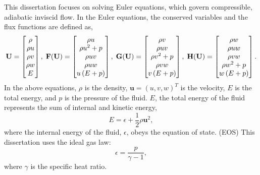 This dissertation focuses on solving Euler equations, which govern
compressible, adiabatic inviscid flow.
In the Euler equations, the conserved variables and the flux functions are defined as,
\begin{equation}\label{eq:euler-3d}
    \mathbf{U} = \begin{bmatrix}
        \rho \\
        \rho u \\
        \rho v \\
        \rho w \\
        E
    \end{bmatrix},\;
    \mathbf{F} (\mathbf{U}) = \begin{bmatrix}
        \rho u \\
        \rho u^{2} + p \\
        \rho u v \\
        \rho u w \\
        u \left( E + p \right)
    \end{bmatrix},\;
    \mathbf{G} (\mathbf{U}) = \begin{bmatrix}
        \rho v \\
        \rho u v \\
        \rho v^{2} + p \\
        \rho v w \\
        v \left( E + p \right)
    \end{bmatrix},\;
    \mathbf{H} (\mathbf{U}) = \begin{bmatrix}
        \rho w \\
        \rho u w \\
        \rho v w \\
        \rho w^{2} + p \\
        w \left( E + p \right)
    \end{bmatrix}.
\end{equation}
In the above equations, \( \rho \) is the density,
\( \mathbf{u} = {(u, v, w)}^{T} \) is the velocity,
\( E \) is the total energy, and \( p \) is the pressure of the fluid.
\( E \), the total energy of the fluid represents the
sum of internal and kinetic energy,
\begin{equation}\label{eq:total_E}
    E = \epsilon + \frac{1}{2} \rho \mathbf{u}^{2},
\end{equation}
where the internal energy of the fluid, \( \epsilon \), obeys the equation of state. (EOS)
This dissertation uses the ideal gas law:
\begin{equation}\label{eq:ideal_eos}
    \epsilon = \frac{p}{\gamma - 1},
\end{equation}
where \( \gamma \) is the specific heat ratio.

